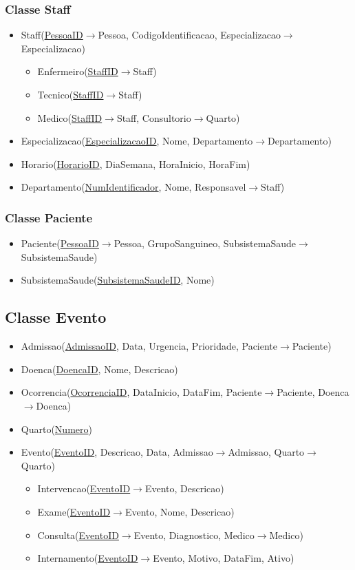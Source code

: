 \documentclass[article, a4paper, 12pt, oneside]{memoir}
\begin{document}
\subsubsection{Classe Staff}
\begin{itemize}
	\item Staff(\underline{PessoaID}$\rightarrow$Pessoa, CodigoIdentificacao, Especializacao$\rightarrow$Especializacao)
	\begin{itemize}
		\item Enfermeiro(\underline{StaffID}$\rightarrow$Staff)
		\item Tecnico(\underline{StaffID}$\rightarrow$Staff)
		\item Medico(\underline{StaffID}$\rightarrow$Staff, Consultorio$\rightarrow$Quarto)
	\end{itemize}
	\item Especializacao(\underline{EspecializacaoID}, Nome, Departamento$\rightarrow$Departamento)
	\item Horario(\underline{HorarioID}, DiaSemana, HoraInicio, HoraFim)
	\item Departamento(\underline{NumIdentificador}, Nome, Responsavel$\rightarrow$Staff)
\end{itemize}
\subsubsection{Classe Paciente}
\begin{itemize}
	\item Paciente(\underline{PessoaID}$\rightarrow$Pessoa, GrupoSanguineo, SubsistemaSaude$\rightarrow$SubsistemaSaude)
	\item SubsistemaSaude(\underline{SubsistemaSaudeID}, Nome)
\end{itemize}
\subsection{Classe Evento}
\begin{itemize}
	\item Admissao(\underline{AdmissaoID}, Data, Urgencia, Prioridade, Paciente$\rightarrow$Paciente)
	\item Doenca(\underline{DoencaID}, Nome, Descricao)
	\item Ocorrencia(\underline{OcorrenciaID}, DataInicio, DataFim, Paciente$\rightarrow$Paciente, Doenca$\rightarrow$Doenca)
	\item Quarto(\underline{Numero})
	\item Evento(\underline{EventoID}, Descricao, Data, Admissao$\rightarrow$Admissao, Quarto$\rightarrow$Quarto)
	\begin{itemize}
		\item Intervencao(\underline{EventoID}$\rightarrow$Evento, Descricao)
		\item Exame(\underline{EventoID}$\rightarrow$Evento, Nome, Descricao)
		\item Consulta(\underline{EventoID}$\rightarrow$Evento, Diagnostico, Medico$\rightarrow$Medico)
		\item Internamento(\underline{EventoID}$\rightarrow$Evento, Motivo, DataFim, Ativo)
	\end{itemize}
\end{itemize}
\end{document}
